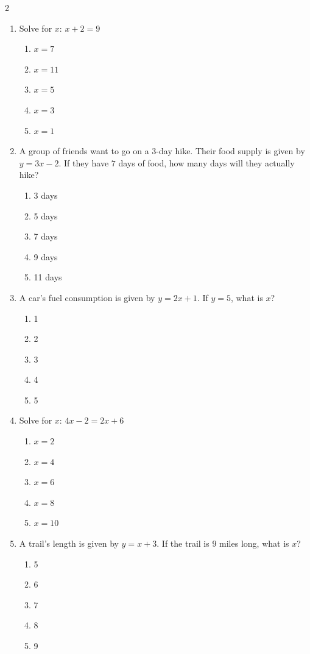 \documentclass[10pt]{article}
\begin{document}
\begin{multicols}{2}
\begin{enumerate}[label=\textbf{Q\arabic*.}, leftmargin=*, itemsep=6pt, parsep=0pt]
  \item \small Solve for $x$: $x + 2 = 9$
  \begin{enumerate}[label=(\Alph*), leftmargin=0.6cm, nosep, itemsep=2pt]
    \item $x = 7$
    \item $x = 11$
    \item $x = 5$
    \item $x = 3$
    \item $x = 1$
  \end{enumerate}

  \item \small A group of friends want to go on a $3$-day hike. Their food supply is given by $y = 3x - 2$. If they have $7$ days of food, how many days will they actually hike?
  \begin{enumerate}[label=(\Alph*), leftmargin=0.6cm, nosep, itemsep=2pt]
    \item 3 days
    \item 5 days
    \item 7 days
    \item 9 days
    \item 11 days
  \end{enumerate}

  \item \small A car's fuel consumption is given by $y = 2x + 1$. If $y = 5$, what is $x$?
  \begin{enumerate}[label=(\Alph*), leftmargin=0.6cm, nosep, itemsep=2pt]
    \item 1
    \item 2
    \item 3
    \item 4
    \item 5
  \end{enumerate}

  \item \small Solve for $x$: $4x - 2 = 2x + 6$
  \begin{enumerate}[label=(\Alph*), leftmargin=0.6cm, nosep, itemsep=2pt]
    \item $x = 2$
    \item $x = 4$
    \item $x = 6$
    \item $x = 8$
    \item $x = 10$
  \end{enumerate}

  \item \small A trail's length is given by $y = x + 3$. If the trail is $9$ miles long, what is $x$?
  \begin{enumerate}[label=(\Alph*), leftmargin=0.6cm, nosep, itemsep=2pt]
    \item 5
    \item 6
    \item 7
    \item 8
    \item 9
  \end{enumerate}

\end{enumerate}
\end{multicols}
\end{document}
